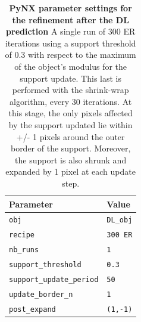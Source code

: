 \begin{table}[H] 

    \centering
    {%
      \begin{tabular}{|l|l|}
        \hline
        \textbf{Parameter} & \textbf{Value} \\
        \hline 
        \texttt{obj}                                     & \texttt{DL\_obj} \\
        \texttt{recipe}                                  & \texttt{300 ER} \\
        \texttt{nb\_runs}                                & \texttt{1} \\
        \texttt{support\_threshold}                      & \texttt{0.3} \\
        \texttt{support\_update\_period}                 & \texttt{50} \\
        \texttt{update\_border\_n}                       & \texttt{1} \\
        \texttt{post\_expand}                            & \texttt{(1,-1)} \\
        \hline
      \end{tabular}%
    } 
    \caption{\textbf{PyNX parameter settings for the refinement after the DL prediction} A single run of 300 ER iterations 
    using a support threshold of 0.3 with respect to the maximum of the object's modulus for the support update. This 
    last is performed with the shrink-wrap algorithm, every 30 iterations. At this stage, the only pixels affected 
    by the support updated lie within +/- 1 pixels around the outer border of the support. Moreover, the support is 
    also shrunk and expanded by 1 pixel at each update step. }
    \label{table:DLpynx}
  \end{table}

